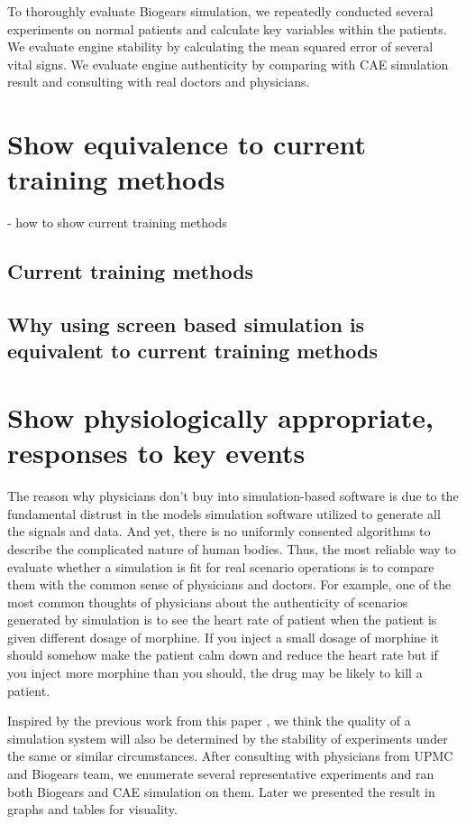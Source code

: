 \documentclass[a4paper]{article}
\begin{document}
To thoroughly evaluate Biogears simulation, we repeatedly conducted several experiments on normal patients and calculate key variables within the patients. We evaluate engine stability by calculating the mean squared error of several vital signs. We evaluate engine authenticity by comparing with CAE simulation result and consulting with real doctors and physicians.  



\section{Show equivalence to current training methods}

- how to show current training methods

\subsection{Current training methods}
\subsection{Why using screen based simulation is equivalent to current training methods}

\section{Show physiologically appropriate, responses to key events}

The reason why physicians don't buy into simulation-based software is due to the fundamental distrust in the models simulation software utilized to generate all the signals and data. And yet, there is no uniformly consented algorithms to describe the complicated nature of human bodies. Thus, the most reliable way to evaluate whether a simulation is fit for real scenario operations is to compare them with the common sense of physicians and doctors. For example, one of the most common thoughts of physicians about the authenticity of scenarios generated by simulation is to see the heart rate of patient when the patient is given different dosage of morphine. If you inject a small dosage of morphine it should somehow make the patient calm down and reduce the heart rate but if you inject more morphine than you should, the drug may be likely to kill a patient. 

Inspired by the previous work from this paper \cite{measure_repeatability}, we think the quality of a simulation system will also be determined by the stability of experiments under the same or similar circumstances. After consulting with physicians from UPMC and Biogears team, we enumerate several representative experiments and ran both Biogears and CAE simulation on them. Later we presented the result in graphs and tables for visuality.
\end{document}

